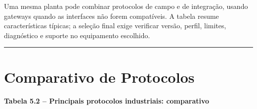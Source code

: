 Uma mesma planta pode combinar protocolos de campo e de integração, usando gateways quando as
interfaces não forem compatíveis. A tabela resume características típicas; a seleção final exige
verificar versão, perfil, limites, diagnóstico e suporte no equipamento escolhido.

\begin{center}\rule{0.5\linewidth}{0.5pt}\end{center}

\section{Comparativo de Protocolos}\label{comparativo-de-protocolos}

\textbf{Tabela 5.2 -- Principais protocolos industriais: comparativo}

